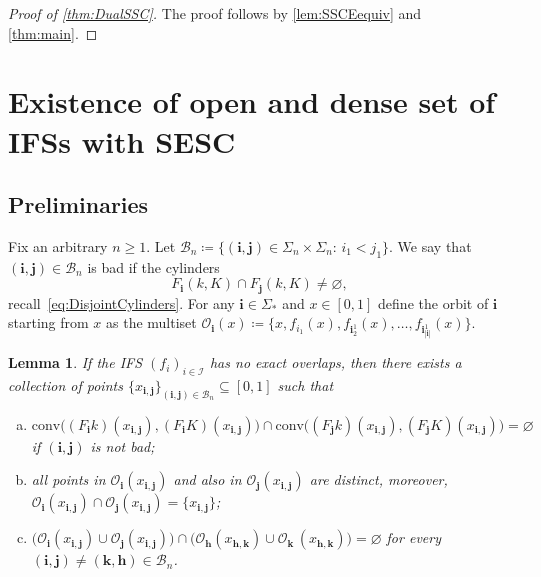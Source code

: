 \documentclass[12pt,]{article}
\def\cref#1{\ref{#1}}%
\newtheorem{lemma}[theorem]{Lemma}
\theoremstyle{definition}
\theoremstyle{remark}
\newcommand{\0}{\mathbf{0}}
\newcommand{\bi}{\mathbf{i}}
\newcommand{\bj}{\mathbf{j}}
\newcommand{\bk}{{\mathbf{k}}}
\newcommand{\bh}{{\mathbf{h}}}
\begin{document}
\begin{proof}[Proof of \cref{thm:DualSSC}]
	The proof follows by \cref{lem:SSCEequiv} and \cref{thm:main}.
\end{proof}

\section{Existence of open and dense set of IFSs with SESC}\label{sec:ProofESCOpenDense}

\subsection{Preliminaries}

Fix an arbitrary $n\geq 1$. Let $\mathcal{B}_n\coloneqq\{(\bi,\bj)\in\Sigma_n\times\Sigma_n:\,
i_1<j_1\}$. We say that $(\bi,\bj)\in\mathcal{B}_n$ is bad if the cylinders
\begin{equation}\label{eq:DefBad}
F_{\bi}(k,K)\cap F_{\bj}(k,K)\neq\varnothing,
\end{equation}
recall~\cref{eq:DisjointCylinders}. For any $\bi\in\Sigma_*$ and $x\in[0,1]$ define the orbit of
$\bi$ starting from $x$ as the multiset $\mathcal{O}_{\bi}(x)\coloneqq \{x,f_{i_1}(x),
f_{\bi_2^1}(x),\ldots,f_{\bi_{|\bi|}^1}(x)\}$. 


\begin{lemma}\label{lem:Pointsx_ij}
If the IFS $(f_i)_{i\in\mathcal{I}}$ has no exact overlaps, then there exists a collection of points
$\{x_{\bi,\bj}\}_{(\bi,\bj)\in\mathcal{B}_n}\subseteq[0,1]$ such that
\begin{enumerate}[(a)]
\item $\mathrm{conv}\big((F_{\bi}k)(x_{\bi,\bj}), (F_{\bi}K)(x_{\bi,\bj})\big) \cap \mathrm{conv}\big((F_{\bj}k)(x_{\bi,\bj}),
	(F_{\bj}K)(x_{\bi,\bj})\big)= \varnothing$ if $(\bi,\bj)$ is not bad;  
\item all points in $\mathcal{O}_{\bi}(x_{\bi,\bj})$ and also in $\mathcal{O}_{\bj}(x_{\bi,\bj})$
  are distinct, moreover,
  $\mathcal{O}_{\bi}(x_{\bi,\bj})\cap\mathcal{O}_{\bj}(x_{\bi,\bj})=\{x_{\bi,\bj}\}$;
\item $\big(\mathcal{O}_{\bi}(x_{\bi,\bj})\cup \mathcal{O}_{\bj}(x_{\bi,\bj})\big) \cap
  \big(\mathcal{O}_{\bh}(x_{\bh,\bk})\cup
  \mathcal{O}_{\bk}\,(x_{\bh,\bk})\big)=\varnothing$ for every $(\bi,\bj)\neq
  (\bk,\bh)\in\mathcal{B}_n$.
\end{enumerate} 
\end{lemma}
\end{document}
